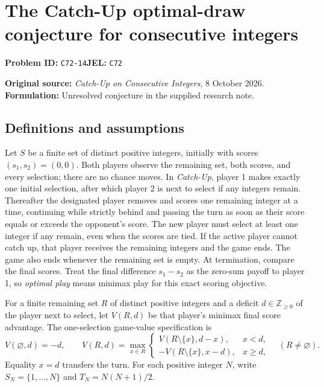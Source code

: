 \documentclass[11pt,a4paper]{article}
\begin{document}
\section*{The Catch-Up optimal-draw conjecture for consecutive integers}
\textbf{Problem ID:} \texttt{C72-14}\quad \textbf{JEL:} \texttt{C72}\par
\label{problem:OP-0589}
\label{supp:catchup}

\noindent\textbf{Original source:} \emph{Catch-Up on Consecutive Integers}, 8 October 2026.
\textbf{Formulation:} Unresolved conjecture in the supplied research note.

\subsection*{Definitions and assumptions}

Let $S$ be a finite set of distinct positive integers, initially with scores
$(s_1,s_2)=(0,0)$. Both players observe the remaining set, both scores,
and every selection; there are no chance moves. In \emph{Catch-Up}, player 1 makes exactly one initial
selection, after which player 2 is next to select if any integers remain.
Thereafter the designated player removes and scores one remaining
integer at a time, continuing while strictly behind and passing the turn as
soon as their score equals or exceeds the opponent's score. The new player
must select at least one integer if any remain, even when the scores are tied.
If the active player cannot catch up, that player receives the remaining
integers and the game ends. The game also ends whenever the remaining set
is empty. At termination, compare the final scores. Treat
the final difference $s_1-s_2$ as the zero-sum payoff to player 1, so
\emph{optimal play} means minimax play for this exact scoring objective.

For a finite remaining set $R$ of distinct positive integers and a deficit
$d\in\mathbb Z_{\ge0}$ of the player next to select,
let $V(R,d)$ be that player's minimax final score advantage. The
one-selection game-value specification is
\[
V(\varnothing,d)=-d,\qquad
V(R,d)=\max_{x\in R}
\begin{cases}
	V(R\setminus\{x\},d-x),&x<d,\\[2pt]
	-V(R\setminus\{x\},x-d),&x\ge d,
\end{cases}\quad(R\ne\varnothing).
\]
Equality $x=d$ transfers the turn. For each positive integer $N$, write
$S_N=\{1,\ldots,N\}$ and $T_N=N(N+1)/2$.
\end{document}
